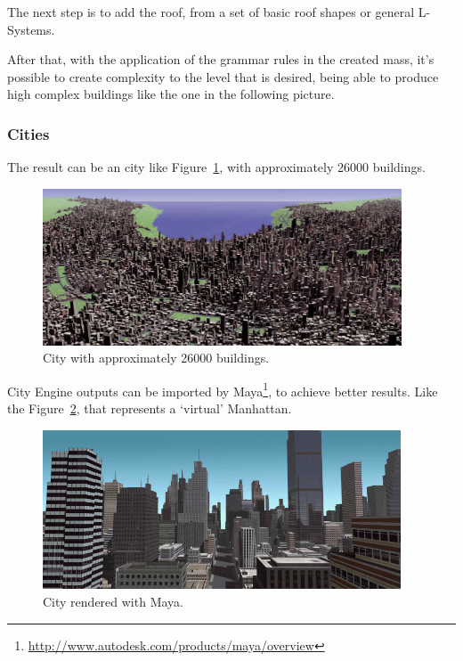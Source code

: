 
The next step is to add the roof, from a set of basic roof shapes or general L-Systems.

After that, with the application of the grammar rules in the created mass, it's possible to create complexity to the level that is desired, being able to produce high complex buildings like the one in the following picture.


\subsubsection{Cities} %
\label{ssub:Cities1}

The result can be an city like Figure~\ref{fig:bigCity}, with approximately 26000 buildings.

\begin{figure}[htbp]
  \centering
  \includegraphics[width=0.95\textwidth]{img/Procedural-Modeling-of-Cities/City.png}
  \caption{City with approximately 26000 buildings.}
  \label{fig:bigCity}
\end{figure}

City Engine outputs can be imported by Maya\footnote{\url{http://www.autodesk.com/products/maya/overview}}, to achieve better results. Like the Figure~\ref{fig:cityMaya}, that represents a ‘virtual’ Manhattan.

\begin{figure}[htbp]
  \centering
  \includegraphics[width=0.95\textwidth]{img/Procedural-Modeling-of-Cities/City_Maya.png}
  \caption{City rendered with Maya.}
  \label{fig:cityMaya}
\end{figure}

